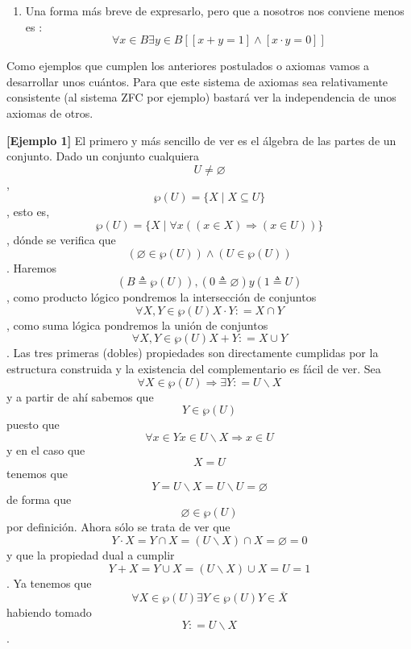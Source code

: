 \begin{enumerate}
\begin{enumerate}
\begin{enumerate}
\begin{enumerate}
        \begin{enumerate}
        \def\labelenumv{\arabic{enumv}.}
        \tightlist
        \item
          {[}sH4.1{]}\[\forall{x \in B}\forall{y \in \widehat{x}}\left( {{x + y} = 1} \right)\]
        \item
          {[}sH4.2{]}\[\forall{x \in B}\forall{y \in \widehat{x}}\left( {{x \cdot y} = 0} \right)\]
        \end{enumerate}
      \item
        Una forma más breve de expresarlo, pero que a nosotros nos
        conviene menos es :
        \[\forall{x \in B}{}{}{}\exists{y \in B}{}{}{}{}\left\lbrack {\left\lbrack {{x + y} = 1} \right\rbrack \land \left\lbrack {{x \cdot y} = 0} \right\rbrack} \right\rbrack\]
      \end{enumerate}
    \end{enumerate}
  \end{enumerate}

  Como ejemplos que cumplen los anteriores postulados o axiomas vamos a
  desarrollar unos cuántos. Para que este sistema de axiomas sea
  relativamente consistente (al sistema ZFC por ejemplo) bastará ver la
  independencia de unos axiomas de otros.

  \textbf{{[}Ejemplo 1{]}} El primero y más sencillo de ver es el
  álgebra de las partes de un conjunto. Dado un conjunto
  cualquiera\[U \neq \varnothing\],
  \[{\wp(U)} = {\{{X \mid {X \subseteq U}}\}}\], esto es,
  \[{\wp(U)} = {\{{X \mid {{\forall x}\left( {{({x \in X})}\Rightarrow{({x \in U})}} \right)}}\}}\],
  dónde se verifica
  que\[\left( {\varnothing \in \wp(U)} \right) \land \left( {U \in \wp(U)} \right)\].
  Ha\-remos\[\left( {B \triangleq \wp(U)} \right),\left( {0 \triangleq \varnothing} \right)y\left( {1 \triangleq U} \right)\],
  como producto lógico pondremos la intersección de
  conjuntos\[\forall X,{Y \in \wp(U)}{X \cdot Y}{: = {X \cap Y}}\], como
  suma lógica pondremos la unión de
  conjuntos\[\forall X,{Y \in \wp(U)}{X + Y}{: = {X \cup Y}}\]. Las tres
  primeras (dobles) propiedades son di\-rectamente cumplidas por la
  estructura construida y la existencia del complementario es fá\-cil de
  ver. Sea
  \[\forall{X \in \wp(U)}\Rightarrow\exists Y{: = {U \smallsetminus X}}\]y a
  partir de ahí sabemos que\[{Y \in \wp(U)}\]puesto
  que\[\forall{x \in Y}{x \in {U \smallsetminus X}}\Rightarrow{x \in U}\]y
  en el caso que\[X = U\]tenemos que
  \[{{Y = {U \smallsetminus X}} = {U \smallsetminus U}} = \varnothing\]de
  forma que\[{\varnothing \in \wp(U)}\]por definición. Ahora sólo se trata
  de ver
  que\[{{{{Y \cdot X} = {Y \cap X}} = {{({U \smallsetminus X})} \cap X}} = \varnothing} = 0\]y
  que la propiedad dual a
  cumplir\[{{{{Y + X} = {Y \cup X}} = {{({U \smallsetminus X})} \cup X}} = U} = 1\].
  Ya tenemos
  que\[\forall{X \in \wp(U)}\exists{Y \in \wp(U)}{Y \in \overline{X}}\]ha\-biendo
  tomado\[Y{: = {U \smallsetminus X}}\].


\end{enumerate}
